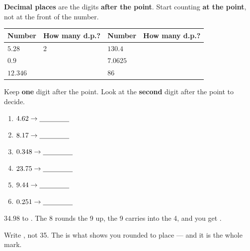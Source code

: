 \documentclass[12pt,a4paper]{article}
\begin{document}

\noindent \textbf{Decimal places} are the digits \textbf{after the point}. Start
counting \textbf{at the point}, not at the front of the number.

\vspace{4pt}
\noindent
\begin{tabularx}{\textwidth}{|C{2.4cm}|C{3.4cm}|C{2.4cm}|L|}
  \hline
  \textbf{Number} & \textbf{How many d.p.?} & \textbf{Number} &
  \textbf{How many d.p.?} \\
  \hline
  $5.28$ \rule[-0.6em]{0pt}{1.9em}    & 2 &
  $130.4$ \rule[-0.6em]{0pt}{1.9em}   & \\ \hline
  $0.9$ \rule[-0.6em]{0pt}{1.9em}     & &
  $7.0625$ \rule[-0.6em]{0pt}{1.9em}  & \\ \hline
  $12.346$ \rule[-0.6em]{0pt}{1.9em}  & &
  $86$ \rule[-0.6em]{0pt}{1.9em}      & \\ \hline
\end{tabularx}


\noindent Keep \textbf{one} digit after the point. Look at the \textbf{second} digit
after the point to decide.

\vspace{4pt}
\begin{multicols}{3}
\begin{enumerate}[label=(\alph*), itemsep=11pt]
  \item $4.62 \rightarrow \blank[1.5cm]$
  \item $8.17 \rightarrow \blank[1.5cm]$
  \item $0.348 \rightarrow \blank[1.5cm]$
  \item $23.75 \rightarrow \blank[1.5cm]$
  \item $9.44 \rightarrow \blank[1.5cm]$
  \item $0.251 \rightarrow \blank[1.5cm]$
\end{enumerate}
\end{multicols}


\begin{remember}
  $34.98$ to . The 8 rounds the 9 up, the 9 carries into the
  4, and you get .

  \smallskip
  Write , not 35. The  is what shows you rounded to
   place --- and it is the whole mark.
\end{remember}
\end{document}
